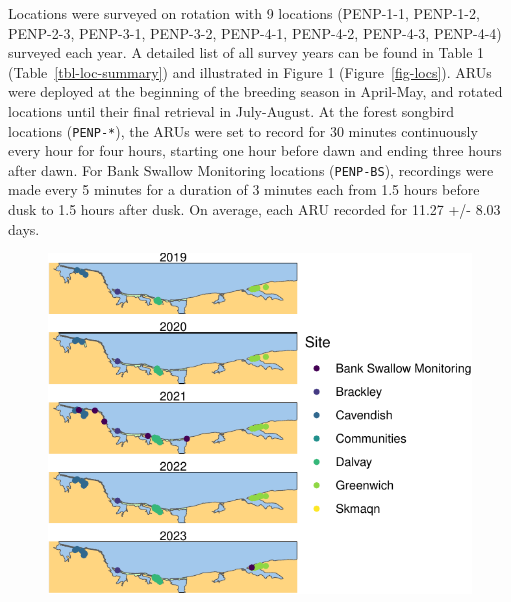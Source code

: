 \documentclass[
  letterpaper,
  DIV=11,
  numbers=noendperiod,
  oneside]{scrartcl}
\begin{document}
Locations were surveyed on rotation with 9 locations (PENP-1-1,
PENP-1-2, PENP-2-3, PENP-3-1, PENP-3-2, PENP-4-1, PENP-4-2, PENP-4-3,
PENP-4-4) surveyed each year. A detailed list of all survey years can be
found in Table 1 (Table~\ref{tbl-loc-summary}) and illustrated in Figure
1 (Figure~\ref{fig-locs}). ARUs were deployed at the beginning of the
breeding season in April-May, and rotated locations until their final
retrieval in July-August. At the forest songbird locations
(\texttt{PENP-*}), the ARUs were set to record for 30 minutes
continuously every hour for four hours, starting one hour before dawn
and ending three hours after dawn. For Bank Swallow Monitoring locations
(\texttt{PENP-BS}), recordings were made every 5 minutes for a duration
of 3 minutes each from 1.5 hours before dusk to 1.5 hours after dusk. On
average, each ARU recorded for 11.27 +/- 8.03 days.

\begin{figure}


{\centering \includegraphics{peinp_files/figure-pdf/fig-locs-1.pdf}

}

\end{figure}
\end{document}
